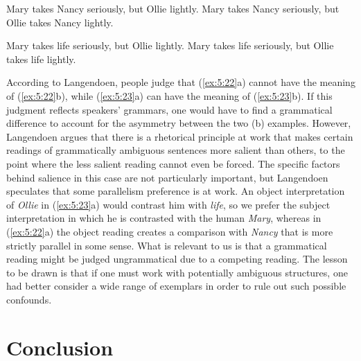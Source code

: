 \ea\label{ex:5:22}
\ea Mary takes Nancy seriously, but Ollie lightly.
\ex Mary takes Nancy seriously, but Ollie takes Nancy lightly.
\z
\z

\ea\label{ex:5:23}
\ea Mary takes life seriously, but Ollie lightly.
\ex Mary takes life seriously, but Ollie takes life lightly.
\z
\z

\noindent
According to Langendoen, people judge that (\ref{ex:5:22}a) cannot have the meaning of (\ref{ex:5:22}b), while (\ref{ex:5:23}a) can have the meaning of (\ref{ex:5:23}b). If this judgment reflects speakers' grammars, one would have to find a grammatical difference to account for the asymmetry between the two (b) examples. However, Langendoen argues that there is a rhetorical principle at work that makes certain readings of grammatically ambiguous sentences more salient than others, to the point where the less salient reading cannot even be forced. The specific factors behind salience in this case are not particularly important, but Langendoen speculates   that some parallelism    preference is at work. An object interpretation of \textit{Ollie} in (\ref{ex:5:23}a)  would
contrast him with \textit{life}, so we prefer the subject interpretation in which he is contrasted with the human \textit{Mary}, whereas in (\ref{ex:5:22}a) the object reading creates a comparison with \textit{Nancy} that is more strictly parallel in some sense. What is relevant to us is that a grammatical reading might be judged ungrammatical due to a competing reading. The lesson to be drawn is that if one must work with potentially ambiguous structures, one had better consider a wide range of exemplars in order to rule out such possible confounds.

\section{Conclusion} \label{sec:5.4}

